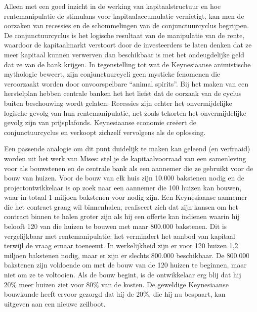 Alleen met een goed inzicht in de werking van kapitaalstructuur en hoe rentemanipulatie de stimulans voor kapitaalaccumulatie vernietigt, kan men de oorzaken van recessies en de schommelingen van de conjunctuurcyclus begrijpen. De conjunctuurcyclus is het logische resultaat van de manipulatie van de rente, waardoor de kapitaalmarkt verstoort door de investeerders te laten denken dat ze meer kapitaal kunnen verwerven dan beschikbaar is met het ondeugdelijke geld dat ze van de bank krijgen. In tegenstelling tot wat de Keynesiaanse animistische mythologie beweert, zijn conjunctuurcycli geen mystieke fenomenen die veroorzaakt worden door onvoorspelbare ``animal spirits''. Bij het maken van een herstelplan hebben centrale banken het het liefst dat de oorzaak van de cyclus buiten beschouwing wordt gelaten. Recessies zijn echter het onvermijdelijke logische gevolg van hun rentemanipulatie, net zoals tekorten het onvermijdelijke gevolg zijn van prijsplafonds. Keynesiaanse economie creëert de conjunctuurcyclus en verkoopt zichzelf vervolgens als de oplossing.

Een passende analogie om dit punt duidelijk te maken kan geleend (en verfraaid) worden uit het werk van Mises: stel je de kapitaalvoorraad van een samenleving voor als bouwstenen en de centrale bank als een aannemer die ze gebruikt voor de bouw van huizen. Voor de bouw van elk huis zijn 10.000 bakstenen nodig en de projectontwikkelaar is op zoek naar een aannemer die 100 huizen kan bouwen, waar in totaal 1 miljoen bakstenen voor nodig zijn. Een Keynesiaanse aannemer die het contract graag wil binnenhalen, realiseert zich dat zijn kansen om het contract binnen te halen groter zijn als hij een offerte kan indienen waarin hij belooft 120 van die huizen te bouwen met maar 800.000 bakstenen. Dit is vergelijkbaar met rentemanipulatie: het vermindert het aanbod van kapitaal terwijl de vraag ernaar toeneemt. In werkelijkheid zijn er voor 120 huizen 1,2 miljoen bakstenen nodig, maar er zijn er slechts 800.000 beschikbaar. De 800.000 bakstenen zijn voldoende om met de bouw van de 120 huizen te beginnen, maar niet om ze te voltooien. Als de bouw begint, is de ontwikkelaar erg blij dat hij 20\% meer huizen ziet voor 80\% van de kosten. De geweldige Keynesiaanse bouwkunde heeft ervoor gezorgd dat hij de 20\%, die hij nu bespaart, kan uitgeven aan een nieuwe zeilboot.

